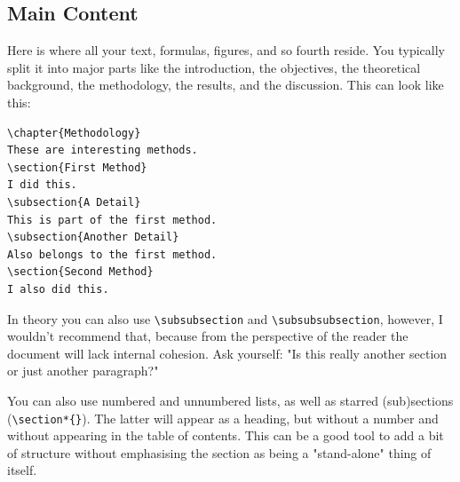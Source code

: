 \documentclass[12pt, todonotes, nodeclaration, oneside, fancypagenumbers, notof, notot, noabstract]{IAUthesis}
\begin{document}
\subsection{Main Content}
Here is where all your text, formulas, figures, and so fourth reside. You typically split it into major parts like the introduction, the objectives, the theoretical background, the methodology, the results, and the discussion. This can look like this:
\begin{verbatim}
\chapter{Methodology}
These are interesting methods.
\section{First Method}
I did this.
\subsection{A Detail}
This is part of the first method.
\subsection{Another Detail}
Also belongs to the first method.
\section{Second Method}
I also did this.
\end{verbatim}
In theory you can also use \texttt{\textbackslash subsubsection} and \texttt{\textbackslash subsubsubsection}, however, I wouldn't recommend that, because from the perspective of the reader the document will lack internal cohesion. Ask yourself: "Is this really another section or just another paragraph?"

You can also use numbered and unnumbered lists, as well as starred (sub)sections (\texttt{\textbackslash section*\{\}}). The latter will appear as a heading, but without a number and without appearing in the table of contents. This can be a good tool to add a bit of structure without emphasising the section as being  a "stand-alone" thing of itself.
\end{document}
